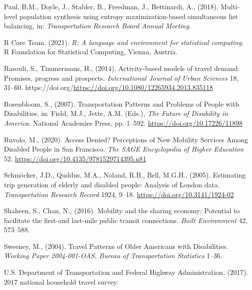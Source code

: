 \documentclass[3p, authoryear, review]{elsarticle} %
\newlength{\cslhangindent}
\newenvironment{CSLReferences}[2] %
 {%
  \setlength{\parindent}{0pt}
  \ifodd #1 \everypar{\setlength{\hangindent}{\cslhangindent}}\ignorespaces\fi
  \ifnum #2 > 0
  \setlength{\parskip}{#2\baselineskip}
  \fi
 }%
 {}
\begin{document}
\begin{CSLReferences}{1}{0}
\leavevmode{}%
Paul, B.M., Doyle, J., Stabler, B., Freedman, J., Bettinardi, A., (2018). Multi-level population synthesis using entropy maximization-based simultaneous list balancing, in: \emph{Transportation Research Board Annual Meeting}.

\leavevmode{}%
R Core Team, (2021). \emph{R: A language and environment for statistical computing}. R Foundation for Statistical Computing, Vienna, Austria.

\leavevmode{}%
Rasouli, S., Timmermans, H., (2014). Activity-based models of travel demand: Promises, progress and prospects. \emph{International Journal of Urban Sciences} 18, 31--60. https://doi.org/\url{https://doi.org/10.1080/12265934.2013.835118}

\leavevmode{}%
Rosenbloom, S., (2007). {Transportation Patterns and Problems of People with Disabilities}, in: Field, M.J., Jette, A.M. (Eds.), \emph{The Future of Disability in America}. National Academies Press, pp. 1--592. \url{https://doi.org/10.17226/11898}

\leavevmode{}%
Ruvolo, M., (2020). {Access Denied? Perceptions of New Mobility Services Among Disabled People in San Francisco}. \emph{The SAGE Encyclopedia of Higher Education} 52. \url{https://doi.org/10.4135/9781529714395.n81}

\leavevmode{}%
Schmöcker, J.D., Quddus, M.A., Noland, R.B., Bell, M.G.H., (2005). {Estimating trip generation of elderly and disabled people: Analysis of London data}. \emph{Transportation Research Record} 1924, 9--18. \url{https://doi.org/10.3141/1924-02}

\leavevmode{}%
Shaheen, S., Chan, N., (2016). Mobility and the sharing economy: Potential to facilitate the first-and last-mile public transit connections. \emph{Built Environment} 42, 573--588.

\leavevmode{}%
Sweeney, M., (2004). {Travel Patterns of Older Americans with Disabilities}. \emph{Working Paper 2004-001-OAS, Bureau of Transportation Statistics} 1--36.

\leavevmode{}%
U.S. Department of Transportation and Federal Highway Administration, (2017). 2017 national household travel survey.


\end{CSLReferences}
\end{document}
